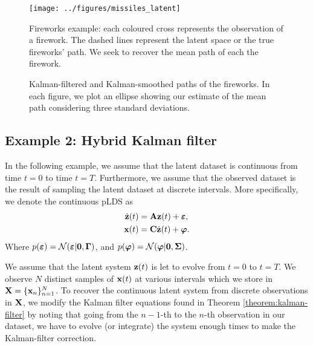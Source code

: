 \documentclass[11pt]{article}
\numberwithin{equation}{section}
\newcommand{\x}{{\bf x}}
\newcommand{\X}{{\bf X}}
\newcommand{\z}{{\bf z}}
\newcommand{\N}{\mathcal{N}}
\begin{document}
\begin{figure}
	\centering
	\texttt{[image: ../figures/missiles\_latent]}
	\caption{Fireworks example: each coloured cross represents the observation of a firework. The dashed lines represent the latent space or the true fireworks' path. We seek to recover the mean path of each the firework.}
	\label{fig:fireworks-latent-observed}
\end{figure}

\begin{figure}
	\hfill
	\hfill
	\hfill
	\caption{Kalman-filtered and Kalman-smoothed paths of the fireworks. In each figure, we plot an ellipse showing our estimate of the mean path considering three standard deviations.}
	\label{fig:fireworks-filtered-smoothed}
\end{figure}


\subsection{Example 2: Hybrid Kalman filter}
In the following example, we assume that the latent dataset is continuous from time $t=0$ to time $t=T$. Furthermore, we assume that the observed dataset is the result of sampling the latent dataset at discrete intervals. More specifically, we denote the continuous pLDS as
\begin{align}
	\dot{\z}(t) &= {\bf A}\z(t) + \boldsymbol{\varepsilon},\\
	\x(t) &= {\bf C} \dot{\z}(t) + \boldsymbol{\varphi}.
\end{align} 
Where $p(\boldsymbol{\varepsilon}) = \N(\boldsymbol{\varepsilon} \vert {\bf 0}, \boldsymbol{\Gamma})$, and $p(\boldsymbol{\varphi}) = \N(\boldsymbol{\varphi} \vert {\bf 0}, \boldsymbol{\Sigma})$.

We assume that the latent system $\z(t)$ is let to evolve from $t=0$ to $t=T$. We observe $N$ distinct samples of $\x(t)$ at various intervals which we store in $\X = \{\x_n\}_{n=1}^N$. To recover the continuous latent system from discrete observations in $\X$, we modify the Kalman filter equations found in Theorem \ref{theorem:kalman-filter} by noting that going from the $n-1$-th to the $n$-th observation in our dataset, we have to evolve (or integrate) the system enough times to make the Kalman-filter correction.
\end{document}
